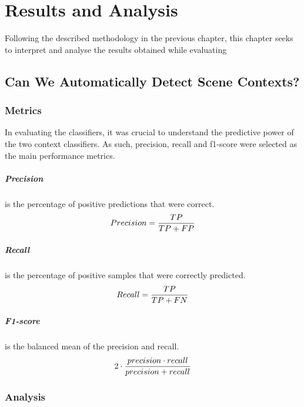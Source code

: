 
\let\textcircled=\pgftextcircled

\chapter{Results and Analysis}
\label{chap:results}

Following the described methodology in the previous chapter, this chapter seeks to interpret and analyse the results obtained while evaluating 


\section{Can We Automatically Detect Scene Contexts?}
\subsection{Metrics}
In evaluating the classifiers, it was  crucial to understand the predictive power of the two context classifiers. As such, precision, recall and f1-score were selected as the main performance metrics. 
\paragraph{Precision} is the percentage of positive predictions that were correct. 
\begin{equation*}
\centering
Precision=\frac{TP}{TP+FP}
\end{equation*}
\paragraph{Recall} is the percentage of positive samples that were correctly predicted. 
\begin{equation*}
\centering
Recall=\frac{TP}{TP+FN}
\end{equation*}
\paragraph{F1-score} is the balanced mean of the precision and recall.  
\begin{equation*}
\centering 
2\cdot\frac{precision\cdot recall}{precision+recall}
\end{equation*}
\subsection{Analysis}

